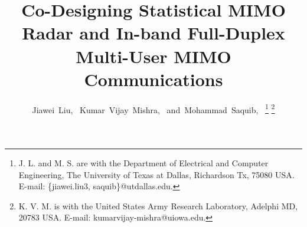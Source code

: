 \documentclass[9pt,journal]{IEEEtran}
\theoremstyle{definition}
\begin{document}
\setlength{\abovedisplayskip}{3pt}
\setlength{\belowdisplayskip}{3pt}
	\title{Co-Designing Statistical MIMO Radar and In-band Full-Duplex Multi-User MIMO Communications}
	\author{Jiawei~Liu,~
		Kumar~Vijay~Mishra,~
		and~Mohammad~Saquib,~
		\vspace{-24pt}%
		\thanks{J. L. and M. S. are with the Department
			of Electrical and Computer Engineering, The University of Texas at Dallas, Richardson
			Tx, 75080 USA. E-mail: \{jiawei.liu3, saquib\}@utdallas.edu.}%
		\thanks{K. V. M. is with the United States Army Research Laboratory, Adelphi MD, 20783 USA. E-mail: kumarvijay-mishra@uiowa.edu.}%
}
	
	
	
	
	
	
	
	
	
	
	
	
	\maketitle
	
\end{document}
